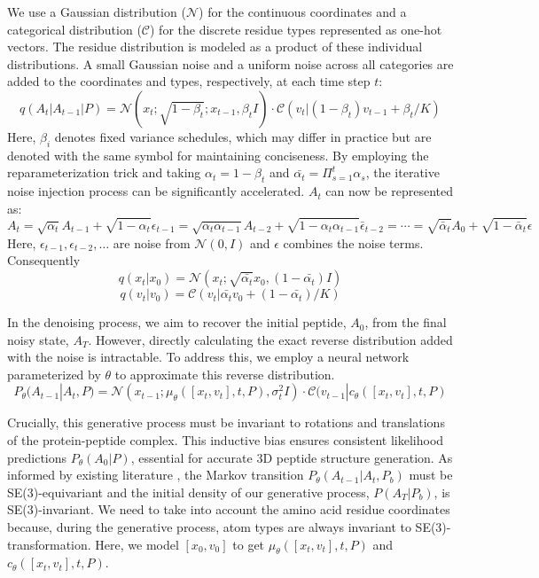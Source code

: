 We use a Gaussian distribution ($\mathcal{N}$) for the continuous coordinates and a categorical distribution ($\mathcal{C}$) for the discrete residue types represented as one-hot vectors. The residue distribution is modeled as a product of these individual distributions. A small Gaussian noise and a uniform noise across all categories are added to the coordinates and types, respectively, at each time step $t$:
$$q(A_t|A_{t-1}|P)=\mathcal{N}(x_t;\sqrt{1-\beta_t};x_{t-1},\beta_t I) \cdot \mathcal{C}(v_t|(1-\beta_t)v_{t-1}+\beta_t/K)$$
Here, $\beta_i$ denotes fixed variance schedules, which may differ in practice but are denoted with the same symbol for maintaining conciseness. By employing the reparameterization trick and taking $\alpha_t = 1 - \beta_t$ and $\bar{\alpha_t} = \Pi_{s=1}^t \alpha_s$, the iterative noise injection process can be significantly accelerated. $A_t$ can now be represented as:
$$A_t =\sqrt{\alpha_t}A_{t-1} + \sqrt{1-\alpha_t}\epsilon_{t-1}
= \sqrt{{\alpha_t}\alpha_{t-1}}A_{t-2} + \sqrt{1-\alpha_t\alpha_{t-1}}\bar{\epsilon}_{t-2} = \cdots = \sqrt{\bar{\alpha}_t}A_0 + \sqrt{1-\bar{\alpha}_t}\epsilon$$
Here, $\epsilon_{t-1}, \epsilon_{t-2}, \ldots$ are noise from $\mathcal{N}(0, I)$ and $\epsilon$ combines the noise terms. Consequently
$$q(x_t|x_0)=\mathcal{N}(x_t;\sqrt{\bar{\alpha_t}}x_0, (1-\bar{\alpha_t})I)$$
$$q(v_t|v_0)=\mathcal{C}(v_t|\bar{\alpha_t}v_0 + (1-\bar{\alpha_t})/K)$$

In the denoising process, we aim to recover the initial peptide, $A_0$, from the final noisy state, $A_T$. However, directly calculating the exact reverse distribution added with the noise is intractable. To address this, we employ a neural network parameterized by $\theta$ to approximate this reverse distribution. \\
$$P_{\theta}(A_{t-1}|A_t, P)=\mathcal{N}(x_{t-1};\mu_{\theta}([x_t, v_t], t, P), \sigma_t^2I) \cdot \mathcal{C}(v_{t-1}|c_\theta([x_t, v_t], t, P)$$

Crucially, this generative process must be invariant to rotations and translations of the protein-peptide complex. This inductive bias ensures consistent likelihood predictions $P_{\theta}(A_0|P)$, essential for accurate 3D peptide structure generation. As informed by existing literature \cite{kohler2020equivariant, xu2022geodiff}, the Markov transition $P_\theta(A_{t-1} |A_t, P_b)$ must be SE(3)-equivariant and the initial density of our generative process, $P(A_T|P_b)$, is SE(3)-invariant. We need to take into account the amino acid residue coordinates because, during the generative process, atom types are always invariant to SE(3)-transformation. Here, we model $[x_0, v_0]$ to get $\mu_{\theta}([x_t, v_t], t, P)$ and $c_\theta([x_t, v_t], t, P)$.  \\

